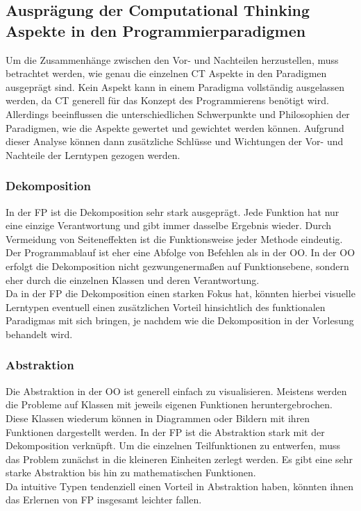 \subsection{Ausprägung der Computational Thinking Aspekte in den Programmierparadigmen}
Um die Zusammenhänge zwischen den Vor- und Nachteilen herzustellen, muss betrachtet werden, wie genau die einzelnen CT Aspekte in den Paradigmen ausgeprägt sind. Kein Aspekt kann in einem Paradigma vollständig ausgelassen werden, da CT generell für das Konzept des Programmierens benötigt wird. Allerdings beeinflussen die unterschiedlichen Schwerpunkte und Philosophien der Paradigmen, wie die Aspekte gewertet und gewichtet werden können.
Aufgrund dieser Analyse können dann zusätzliche Schlüsse und Wichtungen der Vor- und Nachteile der Lerntypen gezogen werden.

\subsubsection{Dekomposition}
In der FP ist die Dekomposition sehr stark ausgeprägt. Jede Funktion hat nur eine einzige Verantwortung und gibt immer dasselbe Ergebnis wieder. Durch Vermeidung von Seiteneffekten ist die Funktionsweise jeder Methode eindeutig. Der Programmablauf ist eher eine Abfolge von Befehlen als in der OO. In der OO erfolgt die Dekomposition nicht gezwungenermaßen auf Funktionsebene, sondern eher durch die einzelnen Klassen und deren Verantwortung.
\\
Da in der FP die Dekomposition einen starken Fokus hat, könnten hierbei visuelle Lerntypen eventuell einen zusätzlichen Vorteil hinsichtlich des funktionalen Paradigmas mit sich bringen, je nachdem wie die Dekomposition in der Vorlesung behandelt wird.

\subsubsection{Abstraktion}
Die Abstraktion in der OO ist generell einfach zu visualisieren. Meistens werden die Probleme auf Klassen mit jeweils eigenen Funktionen heruntergebrochen. Diese Klassen wiederum können in Diagrammen oder Bildern mit ihren Funktionen dargestellt werden.
In der FP ist die Abstraktion stark mit der Dekomposition verknüpft. Um die einzelnen Teilfunktionen zu entwerfen, muss das Problem zunächst in die kleineren Einheiten zerlegt werden.
Es gibt eine sehr starke Abstraktion bis hin zu mathematischen Funktionen.
\\
Da intuitive Typen tendenziell einen Vorteil in Abstraktion haben, könnten ihnen das Erlernen von FP insgesamt leichter fallen.

